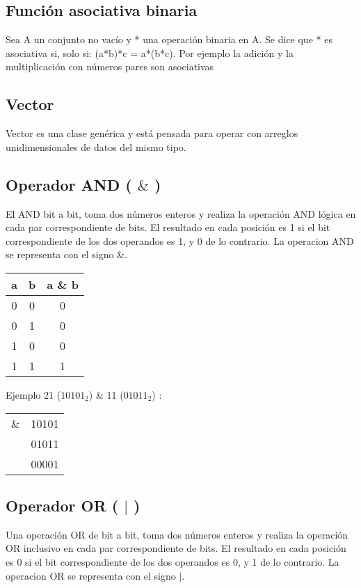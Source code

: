 \subsection{Función asociativa binaria}
Sea A un conjunto no vacío y * una operación binaria en A. Se dice que * es asociativa si, solo si: (a*b)*c = a*(b*c). Por ejemplo la adición y la multiplicación con números pares son asociativas

\subsection{Vector}
Vector es una clase
genérica y está pensada para operar con arreglos unidimensionales de datos del mismo tipo.

\subsection{Operador AND (\emph{ $\&$ })}

El AND bit a bit, toma dos números enteros y realiza la operación AND lógica en cada par
correspondiente de bits. El resultado en cada posición es 1 si el bit correspondiente de los dos
operandos es 1, y 0 de lo contrario. La operacion AND se representa con el signo \&.

\begin{tabular}{c|c|c}
a	& b &  a \& b \\
	\hline
0	& 0 & 0 \\

0	& 1 & 0 \\

1	& 0 & 0  \\

1	& 1 & 1 \\
\end{tabular} 

Ejemplo 21 ($10101_2$) \& 11 ($01011_2$) :

\begin{tabular}{c|c|}
	\&	& 10101  \\
		& 01011 \\
	\hline
		& 00001  \\
\end{tabular} 

\subsection{Operador OR (\emph{ $|$ })}

Una operación OR de bit a bit, toma dos números enteros y realiza la operación OR inclusivo en
cada par correspondiente de bits. El resultado en cada posición es 0 si el bit correspondiente de los
dos operandos es 0, y 1 de lo contrario. La operacion OR se representa con el signo $|$. 


